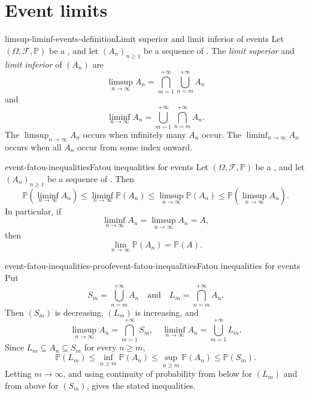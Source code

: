 \documentclass[preview]{standalone}
\begin{document}
\section{Event limits}

\begin{snippetdefinition}{limsup-liminf-events-definition}{Limit superior and limit inferior of events}
    Let \((\Omega,\mathcal{F},\mathbb{P})\) be a \probabilityspace, and
    let \((A_n)_{n\geq 1}\) be a sequence of \event[events]. The
    \emph{limit superior} and \emph{limit inferior} of \((A_n)\) are
    \[
        \limsup_{n\to\infty}A_n
        =
        \bigcap_{m=1}^{+\infty}\bigcup_{n=m}^{+\infty}A_n
    \]
    and
    \[
        \liminf_{n\to\infty}A_n
        =
        \bigcup_{m=1}^{+\infty}\bigcap_{n=m}^{+\infty}A_n.
    \]
    The \event \(\limsup_{n\to\infty}A_n\) occurs when infinitely many
    \(A_n\) occur. The \event \(\liminf_{n\to\infty}A_n\) occurs when
    all \(A_n\) occur from some index onward.
\end{snippetdefinition}

\begin{snippettheorem}{event-fatou-inequalities}{Fatou inequalities for events}
    Let \((\Omega,\mathcal{F},\mathbb{P})\) be a \probabilityspace, and
    let \((A_n)_{n\geq1}\) be a sequence of \event[events]. Then
    \[
        \mathbb{P}\left(\liminf_{n\to\infty}A_n\right)
        \leq
        \liminf_{n\to\infty}\mathbb{P}(A_n)
        \leq
        \limsup_{n\to\infty}\mathbb{P}(A_n)
        \leq
        \mathbb{P}\left(\limsup_{n\to\infty}A_n\right).
    \]
    In particular, if
    \[
        \liminf_{n\to\infty}A_n=\limsup_{n\to\infty}A_n=A,
    \]
    then
    \[
        \lim_{n\to\infty}\mathbb{P}(A_n)=\mathbb{P}(A).
    \]
\end{snippettheorem}

\begin{snippetproof}{event-fatou-inequalities-proof}{event-fatou-inequalities}{Fatou inequalities for events}
    Put
    \[
        S_m=\bigcup_{n=m}^{+\infty}A_n
        \quad\text{and}\quad
        L_m=\bigcap_{n=m}^{+\infty}A_n.
    \]
    Then \((S_m)\) is decreasing, \((L_m)\) is increasing, and
    \[
        \limsup_{n\to\infty}A_n=\bigcap_{m=1}^{+\infty}S_m,
        \quad
        \liminf_{n\to\infty}A_n=\bigcup_{m=1}^{+\infty}L_m.
    \]
    Since \(L_m\subseteq A_n\subseteq S_m\) for every \(n\geq m\),
    \[
        \mathbb{P}(L_m)
        \leq
        \inf_{n\geq m}\mathbb{P}(A_n)
        \leq
        \sup_{n\geq m}\mathbb{P}(A_n)
        \leq
        \mathbb{P}(S_m).
    \]
    Letting \(m\to\infty\), and using continuity of probability from
    below for \((L_m)\) and from above for \((S_m)\), gives the stated
    inequalities.
\end{snippetproof}
\end{document}

